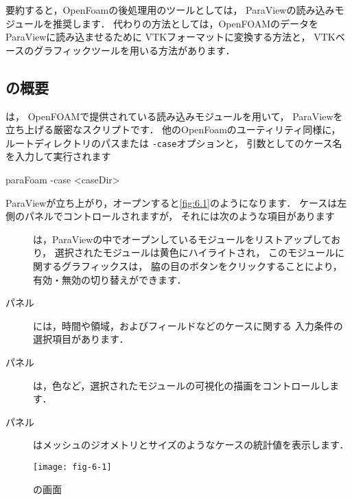 要約すると，OpenFoamの後処理用のツールとしては，
ParaViewの読み込みモジュールを推奨します．
代わりの方法としては，OpenFOAMのデータをParaViewに読み込ませるために
VTKフォーマットに変換する方法と，
VTKベースのグラフィックツールを用いる方法があります．


\subsection{の概要}
\label{ssec:6.1.1}
は，
OpenFOAMで提供されている読み込みモジュールを用いて，
ParaViewを立ち上げる厳密なスクリプトです．
他のOpenFoamのユーティリティ同様に，
ルートディレクトリのパスまたは \texttt{-case}オプションと，
引数としてのケース名を入力して実行されます
\begin{OFverbatim}[terminal]
paraFoam -case <caseDir>
\end{OFverbatim}
ParaViewが立ち上がり，オープンすると\autoref{fig:6.1}のようになります．
ケースは左側のパネルでコントロールされますが，
それには次のような項目があります
\begin{description}
 \item[]
%
%
            は，ParaViewの中でオープンしているモジュールをリストアップしており，
            選択されたモジュールは黄色にハイライトされ，
            このモジュールに関するグラフィックスは，
            脇の目のボタンをクリックすることにより，
            有効・無効の切り替えができます．
 \item[パネル]
%
%
            には，時間や領域，およびフィールドなどのケースに関する
            入力条件の選択項目があります．
 \item[パネル]
%
%
            は，色など，選択されたモジュールの可視化の描画をコントロールします．
 \item[パネル]
%
%
            はメッシュのジオメトリとサイズのようなケースの統計値を表示します．
\end{description}


\begin{figure}[ht]
 \texttt{[image: fig-6-1]}
 \caption{の画面}
 \label{fig:6.1}
\end{figure}


